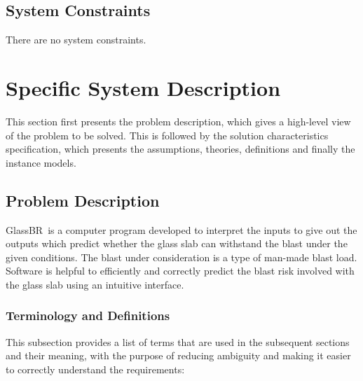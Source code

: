 \documentclass[12pt]{article}
\newcommand{\progname}{GlassBR}
\begin{document}
\subsection{System Constraints}

There are no system constraints.


\section{Specific System Description}

This section first presents the problem description, which gives a high-level
view of the problem to be solved.  This is followed by the solution characteristics
specification, which presents the assumptions, theories, definitions and finally
the instance models. 

\subsection{Problem Description}\label{Sec_pd}

\progname\ is a computer program developed to interpret the inputs to give out
the outputs which predict whether the glass slab can withstand the blast under the given
conditions. The blast under consideration is a type of man-made blast load. Software is
helpful to efficiently and correctly predict the blast risk involved with the glass slab using
an intuitive interface.


\subsubsection{Terminology and  Definitions}

This subsection provides a list of terms that are used in the subsequent
sections and their meaning, with the purpose of reducing ambiguity and making it
easier to correctly understand the requirements:
\end{document}
